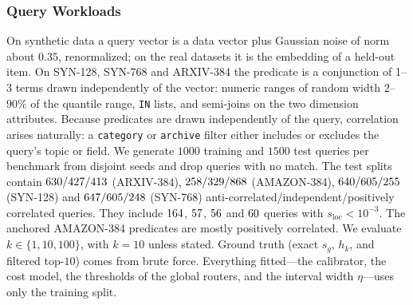 \documentclass[sigconf,nonacm]{acmart}
\newcommand{\sg}{s_g}
\newcommand{\sloc}{s_{\text{loc}}}
\begin{document}
\subsubsection{Query Workloads}
On synthetic data a query vector is a data vector plus Gaussian noise of norm about $0.35$, renormalized; on the real datasets it is the embedding of a held-out item. On SYN-128, SYN-768 and ARXIV-384 the predicate is a conjunction of 1--3 terms drawn independently of the vector: numeric ranges of random width $2$--$90\%$ of the quantile range, \texttt{IN} lists, and semi-joins on the two dimension attributes. Because predicates are drawn independently of the query, correlation arises naturally: a \texttt{category} or \texttt{archive} filter either includes or excludes the query's topic or field. We generate $1000$ training and $1500$ test queries per benchmark from disjoint seeds and drop queries with no match. The test splits contain $630/427/413$ (ARXIV-384), $258/329/868$ (AMAZON-384), $640/605/255$ (SYN-128) and $647/605/248$ (SYN-768) anti-correlated/independent/positively correlated queries. They include $164$, $57$, $56$ and $60$ queries with $\sloc<10^{-3}$. The anchored AMAZON-384 predicates are mostly positively correlated. We evaluate $k\in\{1,10,100\}$, with $k=10$ unless stated. Ground truth (exact $\sg$, $h_k$, and filtered top-$10$) comes from brute force. Everything fitted---the calibrator, the cost model, the thresholds of the global routers, and the interval width $\eta$---uses only the training split.
\end{document}
